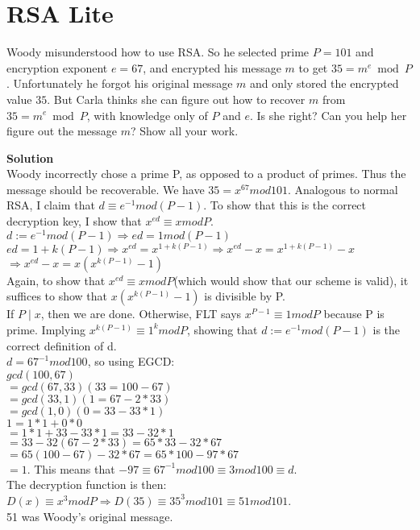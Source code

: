 \documentclass[11pt]{article}
\newcommand*{\Question}[1]{\section{#1}}
\begin{document}
\Question{RSA Lite} 

Woody misunderstood how to use RSA. 
So he selected prime $P = 101$ and encryption 
exponent $e = 67$, and encrypted his message $m$ to get $35 = m^e \bmod P$.
Unfortunately he forgot his original message $m$
and only stored the encrypted value $35$. But Carla thinks she 
can figure out how to recover $m$ from $35 = m^e \bmod P$, with 
knowledge only of $P$ and $e$. Is she right? 
Can you help her figure out the message $m$? Show all your work. 
\begin{mdframed} \textbf{Solution} \\
Woody incorrectly chose a prime P, as opposed to a product of primes. Thus the message should be recoverable. We have $35=x^{67}mod101$. Analogous to normal RSA, I claim that $d \equiv e^{-1}mod(P-1)$. To show that this is the correct decryption key, I show that $x^{ed} \equiv xmodP$. \\
$d:=e^{-1}mod(P-1) \Rightarrow ed = 1mod(P-1)$ \\
$ed = 1 + k(P-1) \Rightarrow x^{ed} = x^{1+k(P-1)} \Rightarrow x^{ed}-x = x^{1+k(P-1)}-x$ \\
$\Rightarrow x^{ed}-x = x(x^{k(P-1)}-1)$ \\
Again, to show that $x^{ed} \equiv xmodP$(which would show that our scheme is valid), it suffices to show that $x(x^{k(P-1)}-1)$ is divisible by P. \\
If $P \mid x$, then we are done. Otherwise, FLT says $x^{P-1} \equiv 1modP$ because P is prime. Implying $x^{k(P-1)} \equiv 1^kmodP$, showing that $d:=e^{-1}mod(P-1)$ is the correct definition of d. \\
$d=67^{-1}mod100$, so using EGCD: \\
$gcd(100,67)$ \\
$=gcd(67,33) (33=100-67)$ \\
$=gcd(33,1) (1=67-2*33)$ \\
$=gcd(1,0) (0=33-33*1)$ \\
$1=1*1+0*0$ \\
$=1*1+33-33*1=33-32*1$ \\
$=33-32(67-2*33)=65*33-32*67$ \\
$=65(100-67)-32*67=65*100-97*67$ \\
$=1$. This means that $-97 \equiv 67^{-1}mod100 \equiv 3mod100 \equiv d$. \\
The decryption function is then: $D(x) \equiv x^3modP \Rightarrow D(35) \equiv 35^3mod101 \equiv 51mod101$. \\
51 was Woody's original message.
\end{mdframed}
\end{document}

